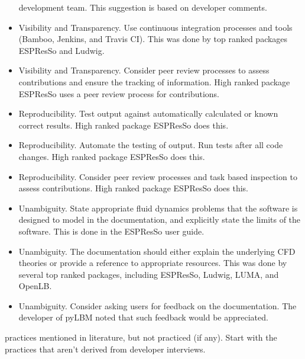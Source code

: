 \documentclass[final, 3p, times, authoryear]{elsarticle}
\begin{document}
\begin{itemize}
	development team. This suggestion is based on developer comments.
	\item Visibility and Transparency. Use continuous integration processes and
	tools (Bamboo, Jenkins, and Travis CI). This was done by top ranked packages
	ESPResSo and Ludwig.
	\item Visibility and Transparency. Consider peer review processes to assess
	contributions and ensure the tracking of information. High ranked package
	ESPResSo uses a peer review process for contributions. 
	\item Reproducibility. Test output against automatically calculated or known
	correct results. High ranked package ESPResSo does this.
	\item Reproducibility. Automate the testing of output. Run tests after all
	code changes. High ranked package ESPResSo does this.
	\item Reproducibility. Consider peer review processes and task based
	inspection to assess contributions. High ranked package ESPResSo does this.
	\item Unambiguity. State appropriate fluid dynamics problems that the
	software is designed to model in the documentation, and explicitly state the
	limits of the software. This is done in the ESPResSo user guide.
	\item Unambiguity. The documentation should either explain the underlying
	CFD theories or provide a reference to appropriate resources. This was done
	by several top ranked packages, including ESPResSo, Ludwig, LUMA, and
	OpenLB.
	\item Unambiguity. Consider asking users for feedback on the documentation.
	The developer of pyLBM noted that such feedback would be appreciated.

\end{itemize}

practices mentioned in literature, but not practiced (if any).  Start with the
practices that aren't derived from developer interviews.
\end{document}
